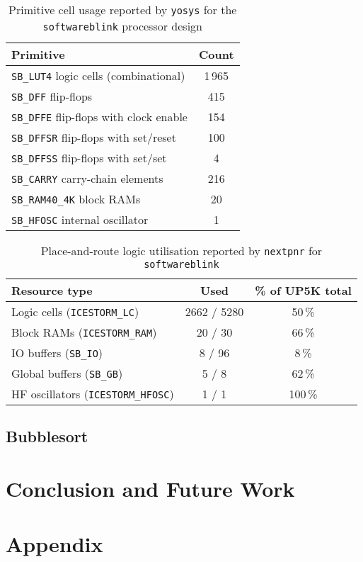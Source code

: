 \documentclass[a4paper,10pt]{article}
\begin{document}
\begin{table}[H]
    \centering
    \begin{tabular}{|l|c|}
        \hline
        \textbf{Primitive} & \textbf{Count} \\
        \hline
        \texttt{SB\_LUT4} logic cells (combinational) & 1\,965 \\
        \texttt{SB\_DFF} flip-flops & 415 \\
        \texttt{SB\_DFFE} flip-flops with clock enable & 154 \\
        \texttt{SB\_DFFSR} flip-flops with set/reset & 100 \\
        \texttt{SB\_DFFSS} flip-flops with set/set & 4 \\
        \texttt{SB\_CARRY} carry-chain elements & 216 \\
        \texttt{SB\_RAM40\_4K} block RAMs & 20 \\
        \texttt{SB\_HFOSC} internal oscillator & 1 \\
        \hline
    \end{tabular}
    \caption{Primitive cell usage reported by \texttt{yosys} for the \texttt{softwareblink} processor design}
    \label{tab:software_yosys_report}
\end{table}


\begin{table}[H]
    \centering
    \begin{tabularx}{0.7\textwidth}{X c c}
        \toprule
        Resource type & Used & \% of UP5K total \\ \midrule
        Logic cells (\texttt{ICESTORM\_LC}) & 2662 / 5280 & 50\,\% \\
        Block RAMs (\texttt{ICESTORM\_RAM})& 20 / 30 & 66\,\% \\
        IO buffers (\texttt{SB\_IO}) & 8 / 96 & 8\,\% \\
        Global buffers (\texttt{SB\_GB}) & 5 / 8 & 62\,\% \\
        HF oscillators (\texttt{ICESTORM\_HFOSC}) & 1 / 1 & 100\,\% \\
        \bottomrule
    \end{tabularx}
    \caption{Place-and-route logic utilisation reported by 
    \texttt{nextpnr} for \texttt{softwareblink}}
    \label{tab:software_pnr_report}
\end{table}



\subsection{Bubblesort}
\label{sec:Bubblesort}

\section{Conclusion and Future Work}
\label{sec:Conclusion_and_Future_Work}

\appendix
\section{Appendix}
\end{document}
